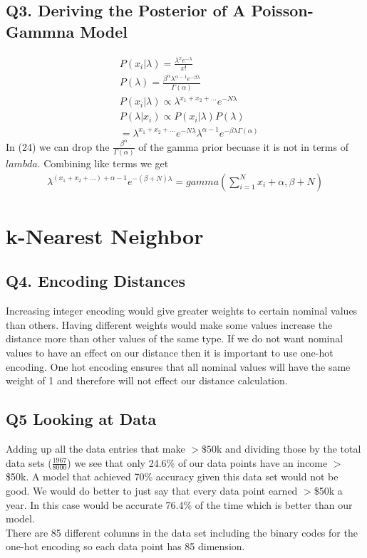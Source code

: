 \documentclass{article}
\begin{document}
\subsection*{Q3. Deriving the Posterior of A Poisson-Gammna Model} 
\begin{align}
    &P(x_i | \lambda) = \frac{\lambda^xe^{-\lambda}}{x!} \\
    &P(\lambda) = \frac{\beta^\alpha\lambda^{\alpha-1}e^{-\beta\lambda}}{\Gamma(\alpha)}\\
    &P(x_i | \lambda) \propto \lambda^{x_1+x_2+...}e^{-N\lambda}\\
    &P(\lambda|x_i) \propto P(x_i|\lambda)P(\lambda)\\
    &=\lambda^{x_1+x_2+...}e^{-N\lambda}\lambda^{\alpha-1}e^{-\beta\lambda\Gamma(\alpha)}
\end{align}
In (24) we can drop the $\frac{\beta^\alpha}{\Gamma(\alpha)}$ of the gamma prior  becuase it is not in terms of $lambda$. Combining like terms we get
\begin{align}
    \lambda^{(x_1+x_2+...)+\alpha-1}e^{-(\beta+N)\lambda}
    = gamma(\sum_{i=1}^Nx_i+\alpha, \beta+N)
\end{align}

\section{k-Nearest Neighbor}

\subsection*{Q4. Encoding Distances} 
Increasing integer encoding would give greater weights to certain nominal values than others. Having different weights would make some values increase the distance more than other values of the same type. If we do not want nominal values to have an effect on our distance then it is important to use one-hot encoding. One hot encoding ensures that all nominal values will have the same weight of 1 and therefore will not effect our distance calculation.

\subsection*{Q5 Looking at Data}
Adding up all the data entries that make $>\$50$k and dividing those by the total data sets ($\frac{1967}{8000}$) we see that only 24.6\% of our data points have an income $>$\$50k. A model that achieved 70\% accuracy given this data set would not be good. We would do better to just say that every data point earned $>$\$50k a year. In this case would be accurate 76.4\% of the time which is better than our model.\\
There are 85 different columns in the data set including the binary codes for the one-hot encoding so each data point has 85 dimension.
\end{document}
